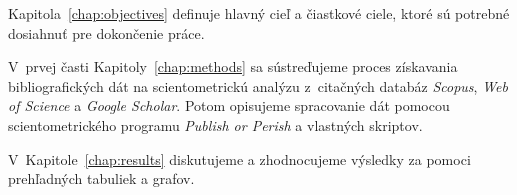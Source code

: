 Kapitola~\ref{chap:objectives} definuje hlavný cieľ a čiastkové ciele, ktoré sú
potrebné dosiahnuť pre dokončenie práce.

V~prvej časti Kapitoly~\ref{chap:methods} sa sústreďujeme proces získavania
bibliografických dát na scientometrickú analýzu z~citačných databáz
\emph{Scopus}, \emph{Web of Science} a \emph{Google Scholar}.  Potom opisujeme
spracovanie dát pomocou scientometrického programu \emph{Publish or Perish} a
vlastných skriptov.

V~Kapitole~\ref{chap:results} diskutujeme a zhodnocujeme výsledky za pomoci
prehľadných tabuliek a grafov.

